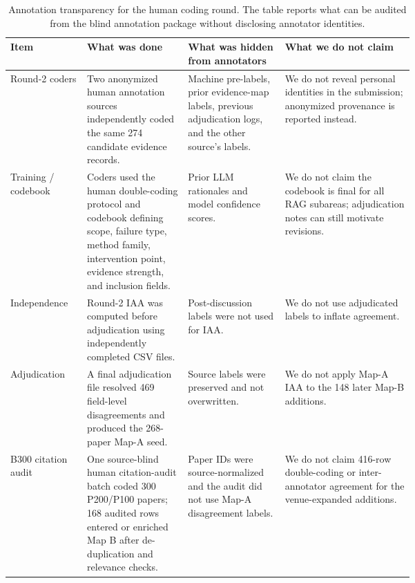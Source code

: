 \documentclass[11pt]{article}
\begin{document}
\begin{table}[t]
\centering
\scriptsize
\renewcommand{\arraystretch}{0.9}
\begin{tabularx}{\linewidth}{>{\raggedright\arraybackslash}p{0.19\linewidth}>{\raggedright\arraybackslash}p{0.25\linewidth}>{\raggedright\arraybackslash}p{0.24\linewidth}X}
\toprule
\textbf{Item} & \textbf{What was done} & \textbf{What was hidden from annotators} & \textbf{What we do not claim} \\
\midrule
Round-2 coders & Two anonymized human annotation sources independently coded the same 274 candidate evidence records. & Machine pre-labels, prior evidence-map labels, previous adjudication logs, and the other source's labels. & We do not reveal personal identities in the submission; anonymized provenance is reported instead. \\
Training / codebook & Coders used the human double-coding protocol and codebook defining scope, failure type, method family, intervention point, evidence strength, and inclusion fields. & Prior LLM rationales and model confidence scores. & We do not claim the codebook is final for all RAG subareas; adjudication notes can still motivate revisions. \\
Independence & Round-2 IAA was computed before adjudication using independently completed CSV files. & Post-discussion labels were not used for IAA. & We do not use adjudicated labels to inflate agreement. \\
Adjudication & A final adjudication file resolved 469 field-level disagreements and produced the 268-paper Map-A seed. & Source labels were preserved and not overwritten. & We do not apply Map-A IAA to the 148 later Map-B additions. \\
B300 citation audit & One source-blind human citation-audit batch coded 300 P200/P100 papers; 168 audited rows entered or enriched Map B after de-duplication and relevance checks. & Paper IDs were source-normalized and the audit did not use Map-A disagreement labels. & We do not claim 416-row double-coding or inter-annotator agreement for the venue-expanded additions. \\
\bottomrule
\end{tabularx}
\caption{Annotation transparency for the human coding round. The table reports what can be audited from the blind annotation package without disclosing annotator identities.}
\label{tab:annotation-transparency}
\end{table}
\end{document}
